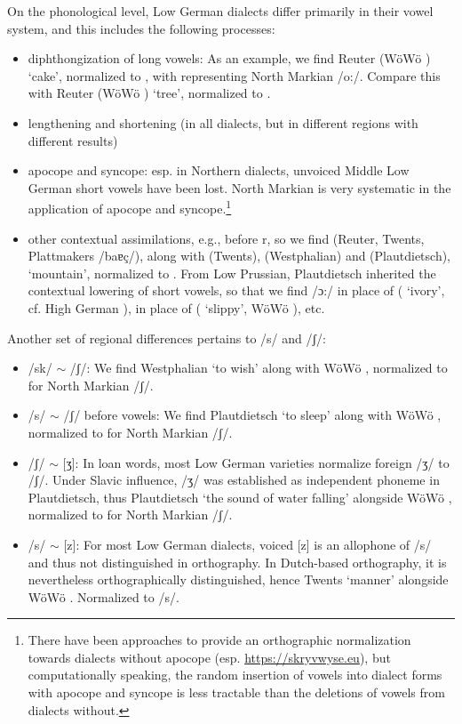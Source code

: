 On the phonological level, Low German dialects differ primarily in their vowel system, and this includes the following processes:

\begin{itemize}
\item diphthongization of long vowels: As an example, we find Reuter  (WöWö ) `cake', normalized to , with  representing North Markian /o:/. Compare this with Reuter  (WöWö ) `tree', normalized to .
\item lengthening and shortening (in all dialects, but in different regions with different results)
\item apocope and syncope: esp. in Northern dialects, unvoiced Middle Low German short vowels have been lost. North Markian is very systematic in the application of apocope and syncope.\footnote{
    There have been approaches to provide an orthographic normalization towards dialects without apocope (esp. \url{https://skryvwyse.eu}), but computationally speaking, the random insertion of vowels into dialect forms with apocope and syncope is less tractable than the deletions of vowels from dialects without.
}
\item other contextual assimilations, e.g., before r, so we find  (Reuter, Twents, Plattmakers 
/baɐç/), 
along with  (Twents),  (Westphalian) and  (Plautdietsch),  `mountain', normalized to . From Low Prussian, Plautdietsch inherited the contextual lowering of short vowels, so that we find  /ɔ:/ in place of  ( `ivory', cf. High German ),  in place of  ( `slippy', WöWö ), etc.
\end{itemize}

Another set of regional differences pertains to /s/ and /ʃ/:

\begin{itemize}
    \item /sk/ $\sim$ /ʃ/: We find Westphalian  `to wish' along with WöWö , normalized to  for North Markian /ʃ/.
    \item /s/ $\sim$ /ʃ/ before vowels: We find Plautdietsch  `to sleep' along with WöWö , normalized to  for North Markian /ʃ/.
    \item /ʃ/ $\sim$ [ʒ]: In loan words, most Low German varieties normalize foreign /ʒ/ to /ʃ/. Under Slavic influence, /ʒ/ was established as independent phoneme in Plautdietsch, thus Plautdietsch  `the sound of water falling' alongside WöWö , normalized to  for North Markian /ʃ/.
    \item /s/ $\sim$ [z]: For most Low German dialects, voiced [z] is an allophone of /s/ and thus not distinguished in orthography. In Dutch-based orthography, it is nevertheless orthographically distinguished, hence Twents  `manner' alongside WöWö . Normalized to /s/.
\end{itemize}

